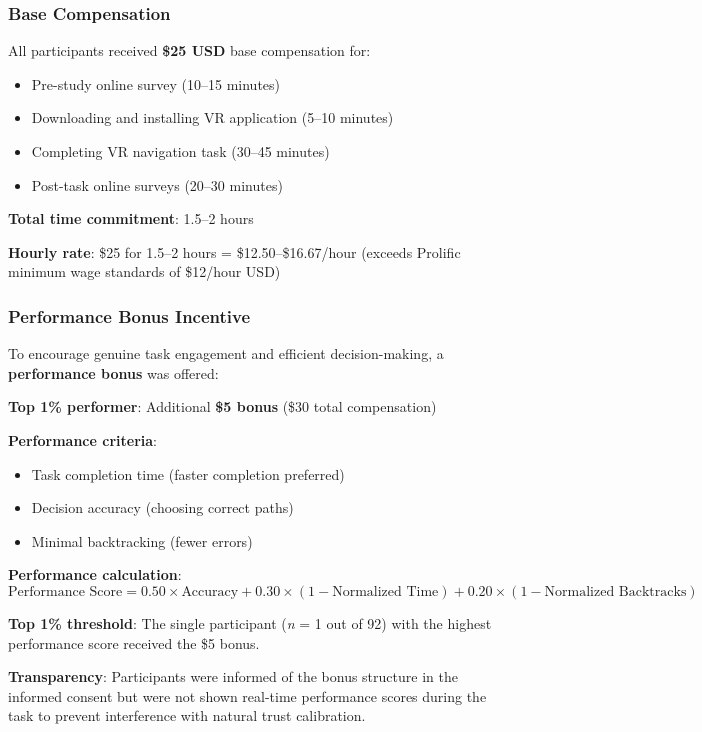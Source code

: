 \documentclass[12pt]{article}
\begin{document}
\subsubsection{Base Compensation}

All participants received \textbf{\$25 USD} base compensation for:
\begin{itemize}
    \item Pre-study online survey (10--15 minutes)
    \item Downloading and installing VR application (5--10 minutes)
    \item Completing VR navigation task (30--45 minutes)
    \item Post-task online surveys (20--30 minutes)
\end{itemize}

\textbf{Total time commitment}: 1.5--2 hours

\textbf{Hourly rate}: \$25 for 1.5--2 hours = \$12.50--\$16.67/hour (exceeds Prolific minimum wage standards of \$12/hour USD)

\subsubsection{Performance Bonus Incentive}

To encourage genuine task engagement and efficient decision-making, a \textbf{performance bonus} was offered:

\textbf{Top 1\% performer}: Additional \textbf{\$5 bonus} (\$30 total compensation)

\textbf{Performance criteria}:
\begin{itemize}
    \item Task completion time (faster completion preferred)
    \item Decision accuracy (choosing correct paths)
    \item Minimal backtracking (fewer errors)
\end{itemize}

\textbf{Performance calculation}:
\begin{equation}
\text{Performance Score} = 0.50 \times \text{Accuracy} + 0.30 \times (1 - \text{Normalized Time}) + 0.20 \times (1 - \text{Normalized Backtracks})
\end{equation}

\textbf{Top 1\% threshold}: The single participant (\textit{n} = 1 out of 92) with the highest performance score received the \$5 bonus.

\textbf{Transparency}: Participants were informed of the bonus structure in the informed consent but were not shown real-time performance scores during the task to prevent interference with natural trust calibration.
\end{document}
